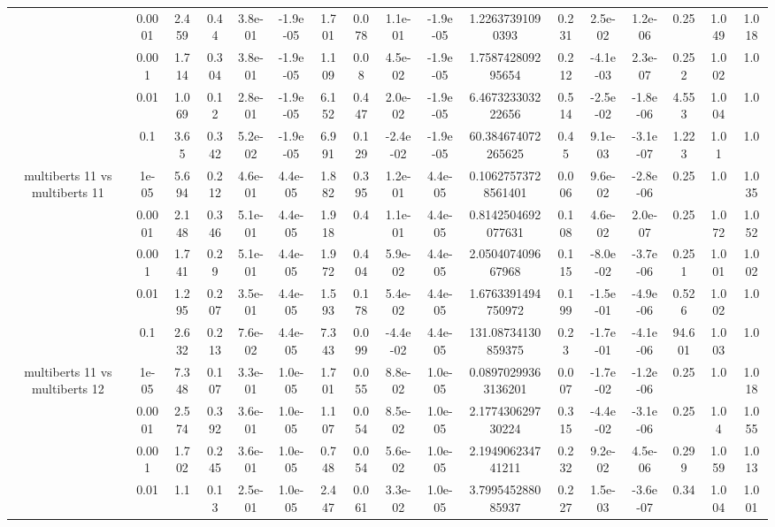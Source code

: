 \begin{tabular}{|c|c|c|c|c|c|c|c|c|c|c|c|c|c|c|c|c|}
 & 0.0001 & 2.459 & 0.44 & 3.8e-01 & -1.9e-05 & 1.701 & 0.078 & 1.1e-01 & -1.9e-05 & 1.22637391090393 & 0.231 & 2.5e-02 & 1.2e-06 & 0.25 & 1.049 & 1.018 \\
 & 0.001 & 1.714 & 0.304 & 3.8e-01 & -1.9e-05 & 1.109 & 0.08 & 4.5e-02 & -1.9e-05 & 1.758742809295654 & 0.212 & -4.1e-03 & 2.3e-07 & 0.252 & 1.002 & 1.0 \\
 & 0.01 & 1.069 & 0.12 & 2.8e-01 & -1.9e-05 & 6.152 & 0.447 & 2.0e-02 & -1.9e-05 & 6.467323303222656 & 0.514 & -2.5e-02 & -1.8e-06 & 4.553 & 1.004 & 1.0 \\
 & 0.1 & 3.65 & 0.342 & 5.2e-02 & -1.9e-05 & 6.991 & 0.129 & -2.4e-02 & -1.9e-05 & 60.384674072265625 & 0.45 & 9.1e-03 & -3.1e-07 & 1.223 & 1.01 & 1.0 \\
\hline
\multirow{5}{*}{multiberts 11 vs multiberts 11} & 1e-05 & 5.694 & 0.212 & 4.6e-01 & 4.4e-05 & 1.882 & 0.395 & 1.2e-01 & 4.4e-05 & 0.10627573728561401 & 0.006 & 9.6e-02 & -2.8e-06 & 0.25 & 1.0 & 1.035 \\
 & 0.0001 & 2.148 & 0.346 & 5.1e-01 & 4.4e-05 & 1.918 & 0.4 & 1.1e-01 & 4.4e-05 & 0.8142504692077631 & 0.108 & 4.6e-02 & 2.0e-07 & 0.25 & 1.072 & 1.052 \\
 & 0.001 & 1.741 & 0.29 & 5.1e-01 & 4.4e-05 & 1.972 & 0.404 & 5.9e-02 & 4.4e-05 & 2.050407409667968 & 0.115 & -8.0e-02 & -3.7e-06 & 0.251 & 1.001 & 1.002 \\
 & 0.01 & 1.295 & 0.207 & 3.5e-01 & 4.4e-05 & 1.593 & 0.178 & 5.4e-02 & 4.4e-05 & 1.6763391494750972 & 0.199 & -1.5e-01 & -4.9e-06 & 0.526 & 1.002 & 1.0 \\
 & 0.1 & 2.632 & 0.213 & 7.6e-02 & 4.4e-05 & 7.343 & 0.099 & -4.4e-02 & 4.4e-05 & 131.08734130859375 & 0.23 & -1.7e-01 & -4.1e-06 & 94.601 & 1.003 & 1.0 \\
\hline
\multirow{5}{*}{multiberts 11 vs multiberts 12} & 1e-05 & 7.348 & 0.107 & 3.3e-01 & 1.0e-05 & 1.701 & 0.055 & 8.8e-02 & 1.0e-05 & 0.08970299363136201 & 0.007 & -1.7e-02 & -1.2e-06 & 0.25 & 1.0 & 1.018 \\
 & 0.0001 & 2.574 & 0.392 & 3.6e-01 & 1.0e-05 & 1.107 & 0.054 & 8.5e-02 & 1.0e-05 & 2.177430629730224 & 0.315 & -4.4e-02 & -3.1e-06 & 0.25 & 1.04 & 1.055 \\
 & 0.001 & 1.702 & 0.245 & 3.6e-01 & 1.0e-05 & 0.748 & 0.054 & 5.6e-02 & 1.0e-05 & 2.194906234741211 & 0.232 & 9.2e-02 & 4.5e-06 & 0.299 & 1.059 & 1.013 \\
 & 0.01 & 1.1 & 0.13 & 2.5e-01 & 1.0e-05 & 2.447 & 0.061 & 3.3e-02 & 1.0e-05 & 3.799545288085937 & 0.227 & 1.5e-03 & -3.6e-07 & 0.34 & 1.004 & 1.001 \\

\end{tabular}
